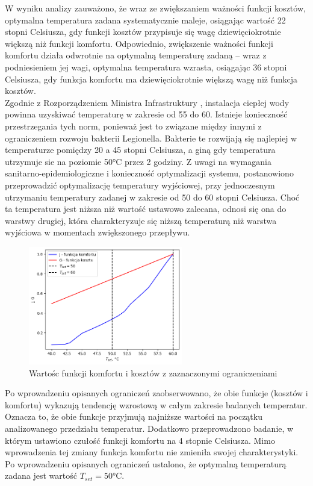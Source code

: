 \documentclass[a4paper,twoside,12pt]{book}
\begin{document}
W wyniku analizy zauważono, że wraz ze zwiększaniem ważności funkcji kosztów, optymalna temperatura zadana systematycznie maleje, osiągając wartość 22 stopni Celsiusza, gdy funkcji kosztów przypisuje się wagę dziewięciokrotnie większą niż funkcji komfortu. Odpowiednio, zwiększenie ważności funkcji komfortu działa odwrotnie na optymalną temperaturę zadaną – wraz z podniesieniem jej wagi, optymalna temperatura wzrasta, osiągając 36 stopni Celsiusza, gdy funkcja komfortu ma dziewięciokrotnie większą wagę niż funkcja kosztów.\\


Zgodnie z Rozporządzeniem Ministra Infrastruktury \cite{bib:Dziennik_ustaw_1, bib:Dziennik_ustaw_2},  instalacja ciepłej wody powinna uzyskiwać temperaturę w zakresie od 55 do 60. Istnieje konieczność przestrzegania tych norm, ponieważ jest to związane między innymi z ograniczeniem rozwoju bakterii Legionella. Bakterie te rozwijają się najlepiej w temperaturze pomiędzy 20 a 45 stopni Celsiusza, a giną gdy temperatura utrzymuje sie na poziomie 50°C przez 2 godziny\cite{bib:CWU_TEMP}. Z uwagi na wymagania sanitarno-epidemiologiczne i konieczność optymalizacji systemu, postanowiono przeprowadzić optymalizację temperatury wyjściowej, przy jednoczesnym utrzymaniu temperatury zadanej w zakresie od 50 do 60 stopni Celsiusza. Choć ta temperatura jest niższa niż wartość ustawowo zalecana, odnosi się ona do warstwy drugiej, która charakteryzuje się niższą temperaturą niż warstwa wyjściowa w momentach zwiększonego przepływu.

\newpage
\begin{figure}[!h]
  \centering
  \includegraphics[width=0.6\textwidth]{img/Opty_ogra.png}
  \caption{Wartośc funkcji komfortu i kosztów z zaznaczonymi ograniczeniami}
  \label{fig:etykieta-rysunku}
\end{figure}
Po wprowadzeniu opisanych ograniczeń zaobserwowano, że obie funkcje (kosztów i komfortu) wykazują tendencję wzrostową w całym zakresie badanych temperatur. Oznacza to, że obie funkcje przyjmują najniższe wartości na początku analizowanego przedziału temperatur. Dodatkowo przeprowadzono badanie, w którym ustawiono czułość funkcji komfortu na 4 stopnie Celsiusza. Mimo wprowadzenia tej zmiany funkcja komfortu nie zmieniła swojej charakterystyki. Po wprowadzeniu opisanych ograniczeń ustalono, że optymalną temperaturą zadana jest wartość $T_{set}=50$°C.
\end{document}
